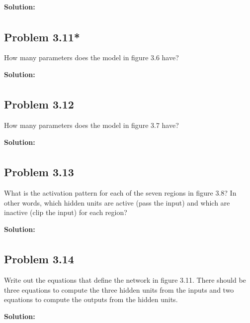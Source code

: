 \documentclass{article}
\begin{document}
        \vspace{1cm}
        \textbf{Solution:}
        \begin{align*}
        \end{align*}

    \subsection*{Problem 3.11*}
    How many parameters does the model in figure 3.6 have?

        \vspace{1cm}
        \textbf{Solution:}
        \begin{align*}
        \end{align*}

    \subsection*{Problem 3.12}
    How many parameters does the model in figure 3.7 have?

        \vspace{1cm}
        \textbf{Solution:}
        \begin{align*}
        \end{align*}

    \subsection*{Problem 3.13}
    What is the activation pattern for each of the seven regions in figure 3.8? In other words, which hidden units are active (pass the input) and which are inactive (clip the input) for each region?

        \vspace{1cm}
        \textbf{Solution:}
        \begin{align*}
        \end{align*}

    \subsection*{Problem 3.14}
    Write out the equations that define the network in figure 3.11. There should be three equations to compute the three hidden units from the inputs and two equations to compute the outputs from the hidden units.

        \vspace{1cm}
        \textbf{Solution:}
        \begin{align*}
        \end{align*}
\end{document}
